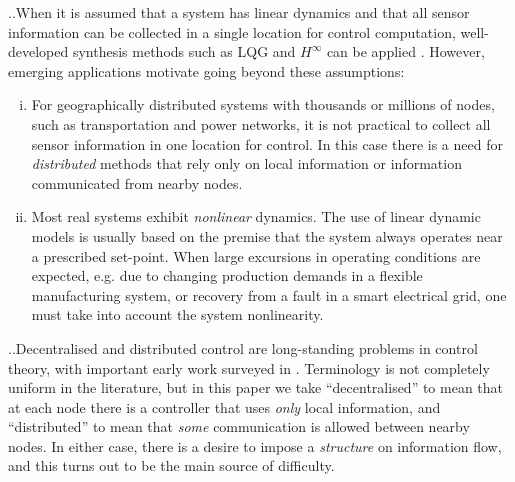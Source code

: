 \documentclass[10pt,twocolumn,twoside]{IEEEtran}
\newcounter{para}
\newcommand\mypara{\par \thesection.\refstepcounter{para}\thepara.\space}
\theoremstyle{plain}
\theoremstyle{definition}
\theoremstyle{remark}
\begin{document}
\mypara When it is assumed that a system  has linear dynamics and that all sensor information can be collected in a single location for control computation, well-developed synthesis methods such as LQG and $H^\infty$ can be applied \cite{anderson1990optimal, dullerud2000course}. However, emerging applications motivate going beyond these assumptions:
\begin{enumerate}[i)]
	\item For geographically distributed systems with thousands or millions of nodes, such as transportation and power networks, it is not practical to collect all sensor information in one location for control. In this case there is a need for {\em distributed} methods that rely only on local information or information communicated from nearby nodes.
 \item Most real systems exhibit {\em nonlinear} dynamics. The use of linear dynamic models is usually based on the premise that the system always operates near a prescribed set-point. When large excursions in operating conditions are expected, e.g. due to changing production demands in a flexible manufacturing system, or recovery from a fault in a smart electrical grid, one must take into account the system nonlinearity.
\end{enumerate} 



\mypara Decentralised and distributed control are long-standing problems in control theory, with important early work surveyed in \cite{sandell_survey_1978}. Terminology is not completely uniform in the literature, but
in this paper we take ``decentralised'' to mean that at each node there is a controller that uses {\em only} local information, and  ``distributed'' to mean that {\em some} communication is allowed between nearby nodes. In either case, there is a desire to impose a {\em structure} on information flow, and this turns out to be the main source of difficulty.
\end{document}
